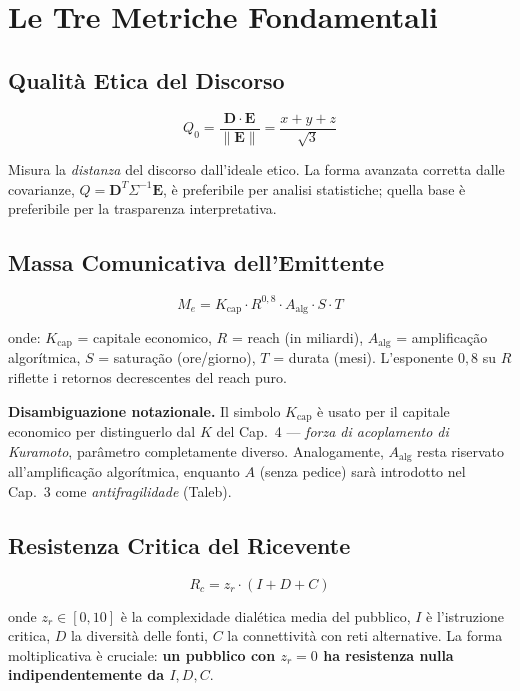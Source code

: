 \section{Le Tre Metriche
Fondamentali}\label{le-tre-metriche-fondamentali}

\subsection{Qualità Etica del
Discorso}\label{qualituxe0-etica-del-discorso}

\[
Q_0 = \frac{\mathbf{D} \cdot \mathbf{E}}{\|\mathbf{E}\|} = \frac{x + y + z}{\sqrt{3}}
\]

Misura la \emph{distanza} del discorso dall'ideale etico. La forma
avanzata corretta dalle covarianze,
\(Q = \mathbf{D}^T \Sigma^{-1} \mathbf{E}\), è preferibile per analisi
statistiche; quella base è preferibile per la trasparenza
interpretativa.

\subsection{Massa Comunicativa
dell'Emittente}\label{massa-comunicativa-dellemittente}

\[
M_e = K_{\text{cap}} \cdot R^{0{,}8} \cdot A_{\text{alg}} \cdot S \cdot T
\]

onde: \(K_{\text{cap}}\) = capitale economico, \(R\) = reach (in
miliardi), \(A_{\text{alg}}\) = amplificação algorítmica, \(S\) =
saturação (ore/giorno), \(T\) = durata (mesi). L'esponente \(0{,}8\)
su \(R\) riflette i retornos decrescentes del reach puro.

\Hypoth{} \textbf{Disambiguazione notazionale.} Il simbolo
\(K_{\text{cap}}\) è usato per il capitale economico per distinguerlo
dal \(K\) del Cap.~4 --- \emph{forza di acoplamento di Kuramoto},
parâmetro completamente diverso. Analogamente, \(A_{\text{alg}}\) resta
riservato all'amplificação algorítmica, enquanto \(A\) (senza pedice)
sarà introdotto nel Cap.~3 come \emph{antifragilidade} (Taleb).

\subsection{Resistenza Critica del
Ricevente}\label{resistenza-critica-del-ricevente}

\[
R_c = z_r \cdot (I + D + C)
\]

onde \(z_r \in [0, 10]\) è la complexidade dialética media del pubblico,
\(I\) è l'istruzione critica, \(D\) la diversità delle fonti, \(C\) la
connettività con reti alternative. La forma moltiplicativa è cruciale:
\textbf{un pubblico con \(z_r = 0\) ha resistenza nulla
indipendentemente da \(I, D, C\)}.



